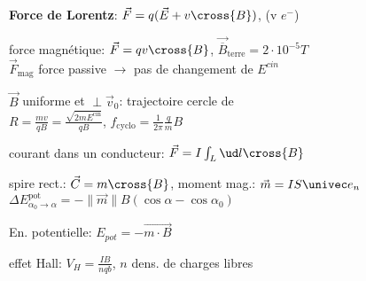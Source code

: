  
%
 
  \squishlist
   \item \textbf{Force de Lorentz}: $\vec F = q(\vec E + {v}\cross{B})$, (v $e^-$)
    \squishlist
     \item force magnétique: $\vec F = q {v}\cross{B}$, $\vec{\overline B}_{\textrm{terre}} = 2 \cdot 10^{-5} T$ \\
           $\vec F_{\textrm{mag}}$ force passive $\rightarrow$ pas de changement de $E^{cin}$
     \item $\vec B$ uniforme et $\perp \vec v_0$: trajectoire cercle de \\
           $R = \frac{mv}{qB} = \frac{\sqrt{2mE^{\textrm{cin}}}}{qB}$, $f_{\textrm{cyclo}} = \frac{1}{2 \pi} \frac{q}{m} B$
     \item courant dans un conducteur: $\vec F = I \int_L {\ud l}\cross{B}$
     \item spire rect.: $\vec C = {m}\cross{B}$, moment mag.: $\vec m = IS \univec e_n$ \\
           $\Delta E_{\alpha_0 \rightarrow \alpha}^{\textrm{pot}} = - \|\vec m\| B (\cos \alpha - \cos \alpha_0)$
     \item En. potentielle: $E_{pot} = -\vec{m\cdot B}$
     \item effet Hall: $V_H = \frac{I B}{n q b}$, $n$ dens. de charges libres
    \squishend

